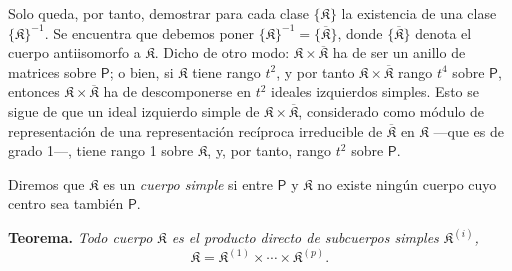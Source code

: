 Solo queda, por tanto, demostrar para cada clase \(\{\mathfrak K\}\) la existencia de una clase \(\{\mathfrak K\}^{-1}\). Se encuentra que debemos poner \(\{\mathfrak K\}^{-1}=\{\overline{\mathfrak K}\}\), donde \(\{\overline{\mathfrak K}\}\) denota el cuerpo antiisomorfo a \(\mathfrak K\). Dicho de otro modo: \(\mathfrak K\times\overline{\mathfrak K}\) ha de ser un anillo de matrices sobre \(\mathsf P\); o bien, si \(\mathfrak K\) tiene rango \(t^2\), y por tanto \(\mathfrak K\times\overline{\mathfrak K}\) rango \(t^4\) sobre \(\mathsf P\), entonces \(\mathfrak K\times\overline{\mathfrak K}\) ha de descomponerse en \(t^2\) ideales izquierdos simples. Esto se sigue de que un ideal izquierdo simple de \(\mathfrak K\times\overline{\mathfrak K}\), considerado como módulo de representación de una representación recíproca irreducible de \(\overline{\mathfrak K}\) en \(\mathfrak K\) ---que es de grado 1---, tiene rango 1 sobre \(\mathfrak K\), y, por tanto, rango \(t^2\) sobre \(\mathsf P\).

Diremos que \(\mathfrak K\) es un \emph{cuerpo simple} si entre \(\mathsf P\) y \(\mathfrak K\) no existe ningún cuerpo cuyo centro sea también \(\mathsf P\).

\textbf{Teorema.} \emph{Todo cuerpo \(\mathfrak K\) es el producto directo de subcuerpos simples \(\mathfrak K^{(i)}\),}
\[
\mathfrak K=\mathfrak K^{(1)}\times\cdots\times\mathfrak K^{(p)}.
\]

